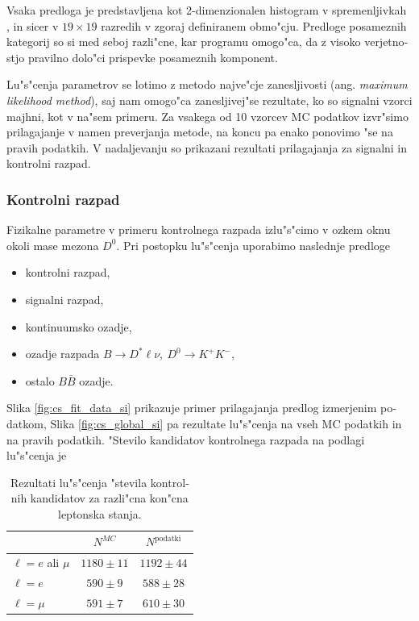 \begin{otherlanguage}{slovene}
Vsaka predloga je predstavljena kot 2-dimenzionalen histogram v spremenljivkah \varss, in sicer v $19\times 19$ razredih v zgoraj definiranem obmo"cju. Predloge posameznih kategorij so si med seboj razli"cne, kar programu omogo"ca, da z visoko verjetnostjo pravilno dolo"ci prispevke posameznih komponent.

Lu"s"cenja parametrov se lotimo z metodo najve"cje zanesljivosti (ang. \textit{maximum likelihood method}), saj nam omogo"ca zanesljivej"se rezultate, ko so signalni vzorci majhni, kot v na"sem primeru. Za vsakega od 10 vzorcev MC podatkov izvr"simo prilagajanje v namen preverjanja metode, na koncu pa enako ponovimo "se na pravih podatkih. V nadaljevanju so prikazani rezultati prilagajanja za signalni in kontrolni razpad.

\subsubsection{Kontrolni razpad}
Fizikalne parametre v primeru kontrolnega razpada izlu"s"cimo v ozkem oknu okoli mase mezona $D^0$. Pri postopku lu"s"cenja uporabimo naslednje predloge
\begin{itemize}
\item kontrolni razpad,
\item signalni razpad,
\item kontinuumsko ozadje,
\item ozadje razpada $B\to D^* \ell \nu,~D^0 \to K^+K^-$,
\item ostalo $B \bar B$ ozadje.
\end{itemize}

Slika \ref{fig:cs_fit_data_si} prikazuje primer prilagajanja predlog izmerjenim podatkom, Slika \ref{fig:cs_global_si} pa rezultate lu"s"cenja na vseh MC podatkih in na pravih podatkih. "Stevilo kandidatov kontrolnega razpada na podlagi lu"s"cenja je

\begin{table}[H]
	\centering
	\begin{tabular}{l|c|c}
		& $N^{MC}$ & $N^{\mathrm{podatki}}$ \\
		\toprule
		$\ell = e$ ali $\mu$ & $1180 \pm 11$ & $1192 \pm 44$\\
		$\ell = e$ & $590 \pm 9$ & $588 \pm 28$ \\
		$\ell = \mu$ & $591 \pm 7$ & $610 \pm 30$\\
		\bottomrule
	\end{tabular}
	\captionsetup{width=0.8\linewidth}
	\caption{Rezultati lu"s"cenja "stevila kontrolnih kandidatov za razli"cna kon"cna leptonska stanja.}
	\label{tab:cs_fit_yield_si}
\end{table}


\end{otherlanguage}
